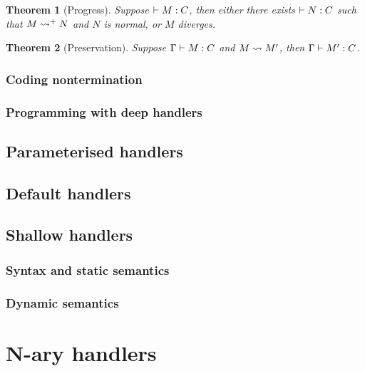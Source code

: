 \documentclass[12pt,phd,lfcs,twoside,openright,logo,leftchapter,normalheadings]{infthesis}
\theoremstyle{plain}
\newtheorem{theorem}{Theorem}[chapter]
\theoremstyle{definition}
\begin{document}
\begin{theorem}[Progress]
  Suppose $\vdash M : C$, then either there exists $\vdash N : C$
  such that $M \leadsto^+ N$ and $N$ is normal, or $M$ diverges.
\end{theorem}

%
\begin{theorem}[Preservation]
  Suppose $\Gamma \vdash M : C$ and $M \leadsto M'$, then
  $\Gamma \vdash M' : C$.
\end{theorem}

\subsection{Coding nontermination}

\subsection{Programming with deep handlers}

\section{Parameterised handlers}
\label{sec:unary-parameterised-handlers}


\section{Default handlers}
\label{sec:unary-default-handlers}

\section{Shallow handlers}
\label{sec:unary-shallow-handlers}

\subsection{Syntax and static semantics}
\subsection{Dynamic semantics}

\chapter{N-ary handlers}
\label{ch:multi-handlers}
\end{document}
